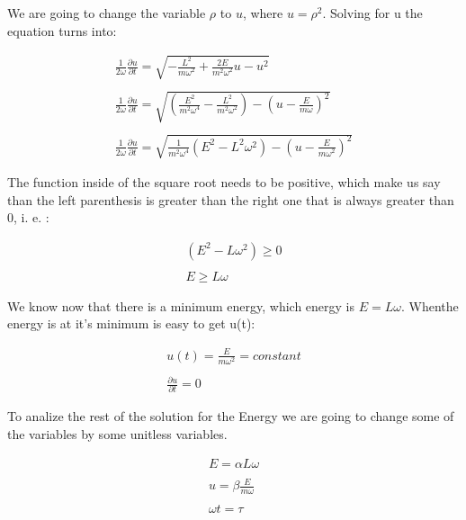 We are going to change the variable $\rho$ to $u$, where $u=\rho^2$. Solving for u the equation turns into:

\begin{equation}
  \begin{array}{c}
    \frac{1}{2\omega}\frac{\partial u}{\partial t} = \sqrt{- \frac{L^2}{m \omega^2}+ \frac{2E}{m^2\omega^2}u -u^2}
    \\

    \\
    \frac{1}{2\omega}\frac{\partial u}{\partial t} = \sqrt{\left(\frac{E^2}{m^2\omega^4} - \frac{L^2}{m^2\omega^2}\right)-\left(u-\frac{E}{m\omega}\right)^2}
    \\

    \\
    \frac{1}{2\omega}\frac{\partial u}{\partial t} = \sqrt{\frac{1}{m^2\omega^4}\left(E^2-L^2\omega^2\right)-\left(u-\frac{E}{m\omega^2}\right)^2}
  \end{array}
\end{equation}

The function inside of the square root needs to be positive, which make us say than the left parenthesis is greater than the right one that is always greater than 0, i. e. :

\begin{equation}
  \begin{array}{c}
    (E^2-L\omega^2) \geq 0
    \\

    \\
    E \geq L\omega
  \end{array}
\end{equation}

We know now that there is a minimum energy, which energy is $E=L\omega$. Whenthe energy is at it's minimum is easy to get u(t):

\begin{equation}
  \begin{array}{c}
    u(t) = \frac{E}{m\omega^2} = constant
    \\

    \\
    \frac{\partial u}{\partial t} = 0
  \end{array}
\end{equation}

To analize the rest of the solution for the Energy we are going to change some of the variables by some unitless variables.

\begin{equation}
  \label{8.8}
  \begin{array}{c}
    E = \alpha L \omega
    \\

    \\
    u = \beta \frac{E}{m\omega}
    \\

    \\
    \omega t = \tau
  \end{array}
\end{equation}

